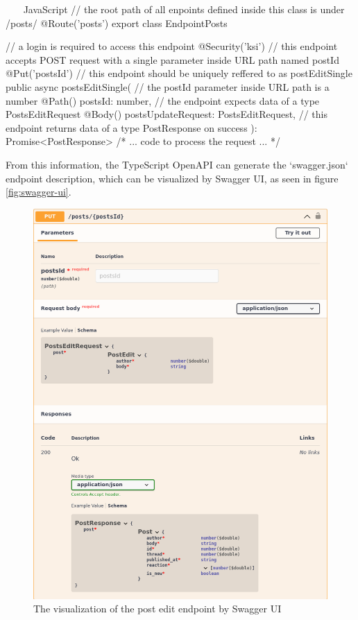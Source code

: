 \documentclass[
  digital, %
  oneside, %
  lof,     %
  nolot,     %
]{fithesis4}
\begin{document}
~~~ JavaScript
// the root path of all enpoints defined inside this class is under /posts/
@Route('posts')
export class EndpointPosts {
// a login is required to access this endpoint
    @Security('ksi')
// this endpoint accepts POST request with a single parameter inside URL path named postId
    @Put('{postsId}')
// this endpoint should be uniquely reffered to as postEditSingle
    public async postsEditSingle(
// the postId parameter inside URL path is a number
        @Path() postsId: number,
// the endpoint expects data of a type PostsEditRequest 
        @Body() postsUpdateRequest: PostsEditRequest,
// this endpoint returns data of a type PostResponse on success
    ): Promise<PostResponse>
    {  /* ... code to process the request ... */  }
~~~

From this information, the TypeScript OpenAPI can generate the `swagger.json` endpoint description, which can be visualized by Swagger \acrshort{UI}, as seen in figure \autoref{fig:swagger-ui}.

\begin{figure}
\includegraphics[width=\textwidth]{assets/img/swagger-ui}
\caption{The visualization of the post edit endpoint by Swagger \acrshort{UI}}
\label{fig:swagger-ui}
\end{figure}

}
\end{document}

